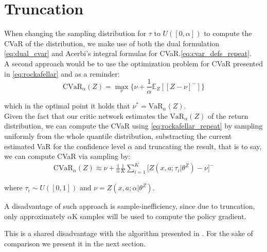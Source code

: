 \section{Truncation}

When changing the sampling distribution for $\tau$ to $U([0,\alpha])$
to compute the CVaR of the
distribution, we make use of both the dual formulation \ref{eq:dual_cvar} and Acerbi's
integral formulas for CVaR.\ref{eq:cvar_defs_repeat}.\\
A second approach would be to use the \citet{Rockafellar2000} optimization problem
for CVaR presented in \ref{eq:rockafellar} and as a reminder:
\begin{equation}
    \text{CVaR}_\alpha (Z) = \underset{\nu} \max \big\{\nu + \frac{1}{\alpha} \mathbb E_Z[[Z- \nu]^-]\big\} \label{eq:rockafellar_repeat}
\end{equation}

which in the optimal point it holds that $\nu^*=\text{VaR}_\alpha(Z)$.\\
Given the fact that our critic network estimates the $\text{VaR}_\alpha(Z)$ of the
return distribution, we can compute the CVaR using \ref{eq:rockafellar_repeat}
by sampling uniformly from  the whole quantile distribution, substracting the current
estimated VaR for the confidence level  $\alpha$ and truncating the result, that is to say,
we can compute CVaR via sampling by:
\begin{align}
    \text{CVaR}_\alpha(Z) \approx \nu + \frac{1}{\alpha} \frac{1}{K}
\sum_{i=1}^K \big[ Z(x,a; \tau_i\vert \theta^Z) - \nu \big]^- 
\end{align}

where $\tau_i \sim U([0,1])$ and $\nu = Z(x,a; \alpha \vert \theta^Z)$.

A disadvantage of such approach is sample-inefficiency, since due to truncation, 
only approximately $\alpha$K samples will be used to compute the policy gradient.

This is a shared disadvantage with the algorithm presented in
\citet{Chow2014}. For the sake of comparison we present it in the next section.
